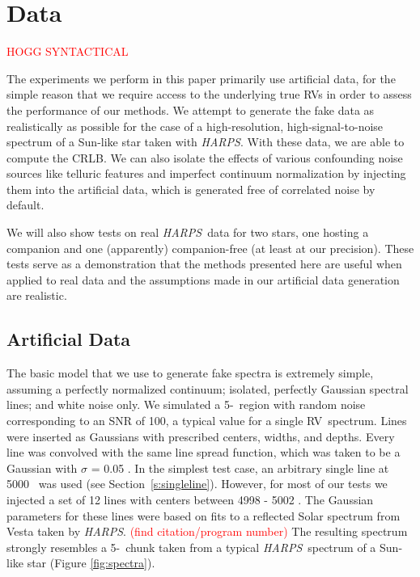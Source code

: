 \documentclass[modern]{aastex63}
\newcommand{\ang}{\text{\normalfont\AA}}
\newcommand{\sectionname}{Section}
\newcommand{\todo}[1]{\textcolor{red}{#1}}  %
\newcommand{\acronym}[1]{{\small{#1}}}
\newcommand{\project}[1]{\textsl{#1}}
\newcommand{\HARPS}{\project{\acronym{HARPS}}}
\newcommand{\RV}{\acronym{RV}}
\newcommand{\CRLB}{\acronym{CRLB}}
\begin{document}
\section{Data}
\label{s:data}

\todo{HOGG SYNTACTICAL}

The experiments we perform in this paper primarily use artificial data, for the simple reason that we require access to the underlying true RVs in order to assess the performance of our methods. 
We attempt to generate the fake data as realistically as possible for the case of a high-resolution, high-signal-to-noise spectrum of a Sun-like star taken with \HARPS. 
With these data, we are able to compute the \CRLB.  
We can also isolate the effects of various confounding noise sources like telluric features and imperfect continuum normalization by injecting them into the artificial data, which is generated free of correlated noise by default.

We will also show tests on real \HARPS\ data for two stars, one hosting a companion and
one (apparently) companion-free (at least at our precision). 
These tests serve as a demonstration that the methods presented here are useful when applied to real data and the assumptions made in our artificial data generation are realistic.

\subsection{Artificial Data}

The basic model that we use to generate fake spectra is extremely simple, assuming a perfectly normalized continuum; isolated, perfectly Gaussian spectral lines; and white noise only. 
We simulated a 5-\ang\ region with random noise corresponding to an SNR of 100, a typical value for a single \RV\ spectrum. 
Lines were inserted as Gaussians with prescribed centers, widths, and depths. 
Every line was convolved with the same line spread function, which was taken to be a Gaussian with $\sigma$ = 0.05 \ang. 
In the simplest test case, an arbitrary single line at 5000 \ang\ was used (see \sectionname~\ref{s:singleline}). 
However, for most of our tests we injected a set of 12 lines with centers between 4998 - 5002 \ang. 
The Gaussian parameters for these lines were based on fits to a reflected Solar spectrum from Vesta taken by \HARPS. \todo{(find citation/program number)} 
The resulting spectrum strongly resembles a 5-\ang\ chunk taken from a typical \HARPS\ spectrum of a Sun-like star (Figure \ref{fig:spectra}).
\end{document}
